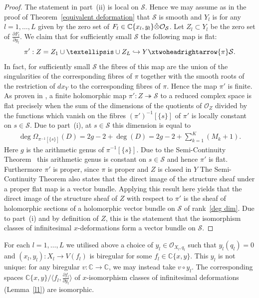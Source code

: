 \documentclass[11pt,twoside]{amsart}
\theoremstyle{plain}
\newcommand{\C}{\mathbb{C}}
\newcommand{\Sm}{\mathcal{S}}
\newcommand{\Sh}[1]{\mathcal{#1}} %
\newcommand{\dfx}{dx}
\begin{document}
\begin{proof}
The statement in part~(ii) is local on $\Sm$. Hence we may assume as in the proof of Theorem~\ref{equivalent deformation} that $\Sm$ is smooth and $Y_l$ is for any $l=1,\ldots,L$ given by the zero set of $F_l\in\mathbb{C}\{x_l,y_l\}\Hat{\otimes}\Sh{O}_{\Sm}$. Let $Z_l\subset Y_l$ be the zero set of $\frac{\partial F_l}{\partial y_l}$. We claim that for sufficiently small $\Sm$ the following map is flat:
$$\pi':Z=Z_1\cup\ldots\cup Z_L\hookrightarrow Y\xtwoheadrightarrow{\pi}\Sm.$$
In fact, for sufficiently small $\Sm$ the fibres of this map are the union of the singularities of the corresponding fibres of $\pi$ together with the smooth roots of the restriction of $\dfx_Y$ to the corresponding fibres of $\pi$. Hence the map $\pi'$ is finite. As proven in \cite[Chapter II Proposition 2.10]{PR:94}, a finite holomorphic map $\pi':Z\twoheadrightarrow\Sm$ to a reduced complex space is flat precisely when the sum of the dimensions of the quotients of $\Sh{O}_Z$ divided by the functions which vanish on the fibres $(\pi')^{-1}[\{s\}]$ of $\pi'$ is locally constant on $s\in\Sm$. Due to part~(i), at $s\in\Sm$ this dimension is equal to
\begin{gather}\label{deg dim}
\deg\Omega_{\pi^{-1}[\{s\}]}(D)=2g-2+\deg(D)=2g-2+\sum_{k=1}^K(M_k+1).
\end{gather}
Here $g$ is the arithmetic genus of $\pi^{-1}[\{s\}]$. Due to the Semi-Continuity Theorem~\cite[Chapter III Theorem 4.7c]{PR:94} this arithmetic genus is constant on $s\in\Sm$ and hence $\pi'$ is flat. Furthermore $\pi'$ is proper, since $\pi$ is proper and $Z$ is closed in $Y$ The Semi-Continuity Theorem also states \cite[Chapter III Theorem 4.7d]{PR:94} that the direct image of the structure sheaf under a proper flat map is a vector bundle. Applying this result here yields that the direct image of the structure sheaf of $Z$ with respect to $\pi'$ is the sheaf of holomorphic sections of a holomorphic vector bundle on $\Sm$ of rank~\eqref{deg dim}. Due to part~(i) and by definition of $Z$, this is the statement that the isomorphism classes of infinitesimal $x$-deformations form a vector bundle on $\Sm$.
\end{proof}
For each $ l = 1,\ldots , L $ we utilised above a choice of $ y_l\in\Sh{O}_{X_l, q_l}$ such that $y_l (q_l) = 0  $ and $ (x_l, y_l): X_l\rightarrow V(f_l) $ is biregular for some $ f_l\in\mathbb C\{x, y\} $. This $y_l $ is not unique: for any biregular $v:\C\rightarrow\C $, we may instead take $v\circ y_l $. The corresponding spaces $\mathbb{C}\{x,y\}\big/\langle f_l,\tfrac{\partial f_l}{\partial y_l}\rangle $ of $ x $-isomorphism classes of infinitesimal deformations (Lemma~\ref{l1}) are  isomorphic.
\end{document}
